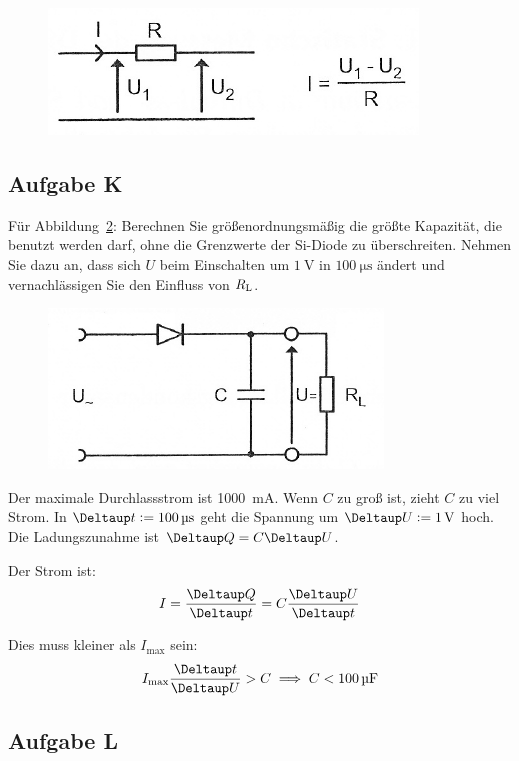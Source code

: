 \begin{figure}[htbp]
	\centering
	\caption{%
		\cite[Abbildung~2.7]{physik313-Anleitung}
	}
	\label{fig:2-7}
	\includegraphics[width=.6\linewidth]{Bilder_aus_Anleitung/2-7.png}
\end{figure}

\FloatBarrier
\subsection{Aufgabe K}

\begin{problem}
	Für Abbildung~\ref{fig:2-8}: Berechnen Sie größenordnungsmäßig die größte
	Kapazität, die benutzt werden darf, ohne die Grenzwerte der Si-Diode zu
	überschreiten. Nehmen Sie dazu an, dass sich $U$ beim Einschalten um
	$\SI{1}\volt$ in $\SI{100}{\micro\second}$ ändert und vernachlässigen Sie
	den Einfluss von $R_\text L$.
\end{problem}

\begin{figure}[htbp]
	\centering
	\caption{%
		\cite[Abbildung~2.8]{physik313-Anleitung}
	}
	\label{fig:2-8}
	\includegraphics[width=.45\linewidth]{Bilder_aus_Anleitung/2-8.png}
\end{figure}

Der maximale Durchlassstrom ist \SI{1000}{\milli\ampere}. Wenn $C$ zu groß ist,
zieht $C$ zu viel Strom. In $\Deltaup t := \SI{100}{\micro\second}$ geht die
Spannung um $\Deltaup U := \SI1\volt$ hoch. Die Ladungszunahme ist $\Deltaup Q
= C \Deltaup U$.

Der Strom ist:
\[
	I = \frac{\Deltaup Q}{\Deltaup t}
	= C \frac{\Deltaup U}{\Deltaup t}
\]

Dies muss kleiner als $I_\text{max}$ sein:
\[
	I_\text{max} \frac{\Deltaup t}{\Deltaup U} > C
	\implies
	C < \SI{100}{\micro\farad}
\]

\FloatBarrier
\subsection{Aufgabe L}

